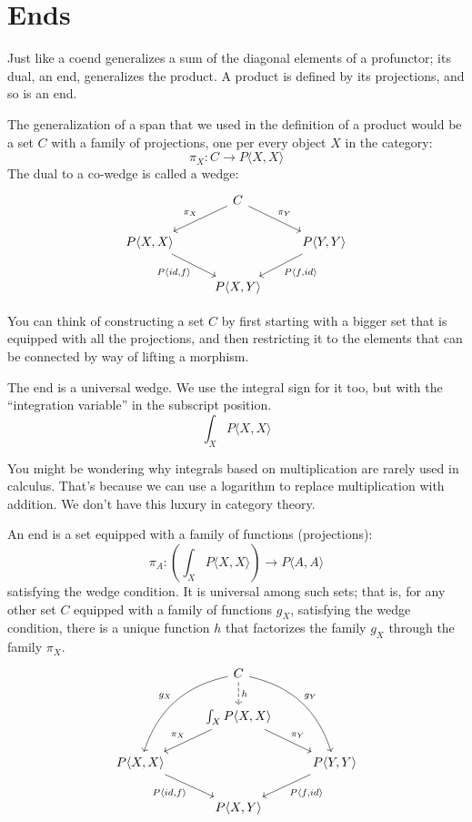 \documentclass[DaoFP]{subfiles}
\begin{document}
\section{Ends}

Just like a coend generalizes a sum of the diagonal elements of a profunctor; its dual, an end, generalizes the product. A product is defined by its projections, and so is an end. 

The generalization of a span that we used in the definition of a product would be a set $C$ with a family of projections, one per every object $X$ in the category:
\[ \pi_X \colon C \to P \langle X, X \rangle \]
The dual to a co-wedge is called a wedge:
\[
 \begin{tikzcd}
 &C
 \arrow[ld, "\pi_X"']
 \arrow[rd, "\pi_Y"]
 \\
 P \langle X, X \rangle
 \arrow[dr, "{P \langle id, f \rangle}"']
 &&P \langle Y, Y \rangle
 \arrow[dl, "{P \langle f, id \rangle}"]
 \\
 & P \langle X, Y \rangle
 \end{tikzcd}
\]

You can think of constructing a set $C$ by first starting with a bigger set that is equipped with all the projections, and then restricting it to the elements that can be connected by way of lifting a morphism. 

The end is a universal wedge. We use the integral sign for it too, but with the ``integration variable'' in the subscript position. 
\[ \int_X P \langle X, X \rangle \]

You might be wondering why integrals based on multiplication are rarely used in calculus. That's because we can use a logarithm to replace multiplication with addition. We don't have this luxury in category theory. 

An end is a set equipped with a family of functions (projections):
\[ \pi_A \colon \left( \int_X P \langle X, X \rangle \right) \to P \langle A, A \rangle \]
satisfying the wedge condition. It is universal among such sets; that is, for any other set $C$ equipped with a family of functions $g_X$, satisfying the wedge condition, there is a unique function $h$ that factorizes the family $g_X$ through the family $\pi_X$.
\[
 \begin{tikzcd}
 &C
 \arrow[ddl, bend right, "g_X"']
 \arrow[ddr, bend left, "g_Y"]
 \arrow[d, dashed, "h"]
 \\
 & \int_X P \langle X, X \rangle
 \arrow[ld, "\pi_X"']
 \arrow[rd, "\pi_Y"]
 \\
 P \langle X, X \rangle
 \arrow[dr, "{P \langle id, f \rangle}"']
 &&P \langle Y, Y \rangle
 \arrow[dl, "{P \langle f, id \rangle}"]
 \\
 & P \langle X, Y \rangle
 \end{tikzcd}
\]
\end{document}
